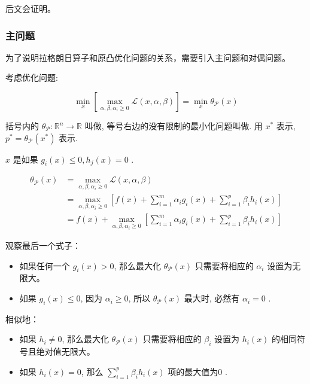 后文会证明。

\subsubsection{主问题}

为了说明拉格朗日算子和原凸优化问题的关系，需要引入主问题和对偶问题。

考虑优化问题:

\begin{problem}
    \label{pbl:primal}
    $$
\min _{x}\left[\max _{\alpha, \beta, \alpha_{i} \geqslant 0} \mathcal{L}(x, \alpha, \beta)\right]=\min _{x} \theta_{\mathcal{P}}(x)
$$

括号内的 $ \theta_{\mathcal{P}}: \mathbb{R}^{n} \rightarrow \mathbb{R} $ 叫做, 等号右边的没有限制的最小化问题叫做. 用 $ x^{*} $ 表示,$ p^{*}=\theta_{\mathcal{P}}\left(x^{*}\right) $ 表示.
\end{problem}

\begin{definition}
    $ x $ 是如果 $ g_{i}(x) \leqslant 0, h_{j}(x)=0 $ .
\end{definition}


$$
\begin{aligned}
\theta_{\mathcal{P}}(x) &=\max _{\alpha, \beta, \alpha_{i} \geqslant 0} \mathcal{L}(x, \alpha, \beta) \\
&=\max _{\alpha, \beta, \alpha_{i} \geqslant 0}\left[f(x)+\sum_{i=1}^{m} \alpha_{i} g_{i}(x)+\sum_{i=1}^{p} \beta_{i} h_{i}(x)\right] \\
&=f(x)+\max _{\alpha, \beta, \alpha_{i} \geqslant 0}\left[\sum_{i=1}^{m} \alpha_{i} g_{i}(x)+\sum_{i=1}^{p} \beta_{i} h_{i}(x)\right]
\end{aligned}
$$

观察最后一个式子：

\begin{itemize}
    \item 如果任何一个 $ g_{i}(x)>0 $, 那么最大化 $ \theta_{\mathcal{P}}(x) $ 只需要将相应的 $ \alpha_{i} $ 设置为无限大。
    \item 如果 $ g_{i}(x) \leqslant 0 $, 因为 $ \alpha_{i} \geqslant 0 $, 所以 $ \theta_{\mathcal{P}}(x) $ 最大时, 必然有 $ \alpha_{i}=0 $ .
\end{itemize}

相似地：

\begin{itemize}
    \item 如果 $ h_{i} \neq 0 $, 那么最大化 $ \theta_{\mathcal{P}}(x) $ 只需要将相应的 $ \beta_{i} $ 设置为 $ h_{i}(x) $ 的相同符号且绝对值无限大。
    \item 如果 $ h_{i}(x)=0 $, 那么 $ \sum_{i=1}^{p} \beta_{i} h_{i}(x) $ 项的最大值为0 .
\end{itemize}

